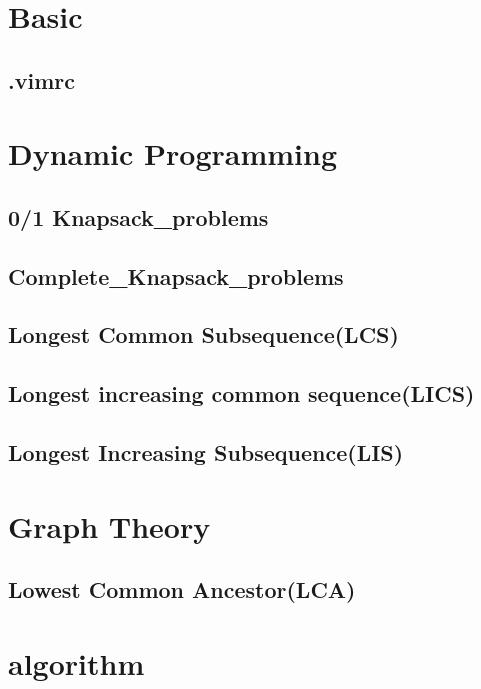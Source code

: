 \section{Basic}
    \subsection{.vimrc}
        

\section{Dynamic Programming}
    \subsection{0/1 Knapsack\_problems}
        
    \subsection{Complete\_Knapsack\_problems}
        
    \subsection{Longest Common Subsequence(LCS)}
        
    \subsection{Longest increasing common sequence(LICS)}
        
    \subsection{Longest Increasing Subsequence(LIS)}
        
\section{Graph Theory}
    \subsection{Lowest Common Ancestor(LCA)}
        
\section{algorithm}
